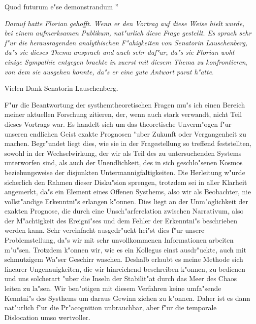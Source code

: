 \documentclass[a5paper,8pt]{book}
\begin{document}
Quod futurum e"se demonstrandum ''

\textit{Darauf hatte Florian gehofft. Wenn er den Vortrag auf diese Weise hielt wurde, bei einem aufmerksamen Publikum, nat"urlich diese Frage gestellt. Es sprach sehr f"ur die herausragenden analythischen F"ahigkeiten von Senatorin Lauschenberg, da"s sie dieses Thema ansprach und auch sehr daf"ur, da"s sie Florian wohl einige Sympathie entgegen brachte in zuerst mit diesem Thema zu konfrontieren, von dem sie ausgehen konnte, da"s er eine gute Antwort parat h"atte.}

\grqq Vielen Dank Senatorin Lauschenberg.

F"ur die Beantwortung der systhemtheoretischen Fragen mu"s ich einen Bereich meiner aktuellen Forschung zitieren, der, wenn auch stark verwandt, nicht Teil dieses Vortrags war. Es handelt sich um das theoretische Unverm"ogen f"ur unseren endlichen Geist exakte Prognosen "uber Zukunft oder Vergangenheit zu machen. Begr"undet liegt dies, wie sie in der Fragestellung so treffend feststellten, sowohl in der Wechselwirkung, der wir als Teil des zu untersuchenden Systems unterworfen sind, als auch der Unendlichkeit, des in sich geschlo"senen Kosmos beziehungsweise der disjunkten Untermannigfaltigkeiten.
Die Herleitung w"urde sicherlich den Rahmen dieser Disku"sion sprengen, trotzdem sei in aller Klarheit angemerkt, da"s ein Element eines Offenen Systhems, also wir als Beobachter, nie vollst"andige Erkenntni"s erlangen k"onnen. Dies liegt an der Unm"oglichkeit der exakten Prognose, die durch eine Unsch"arferelation zwischen Narrativum, also der \grqq M"achtigkeit \grqq des Ereigni"ses und dem Fehler der Erkenntni"s beschrieben werden kann.
Sehr vereinfacht ausgedr"uckt hei"st dies f"ur unsere Problemstellung, da"s wir mit sehr unvollkommenen Informationen arbeiten m"u"sen. Trotzdem k"onnen wir, wie es ein Kollegus einst ausdr"uckte, auch mit schmutzigem Wa"ser Geschirr waschen. Deshalb erlaubt es meine Methode sich linearer Ungenauigkeiten, die wir hinreichend beschreiben k"onnen, zu bedienen und uns solcherart "uber die Inseln der Stabilit"at durch das Meer des Chaos leiten zu la"sen. Wir ben"otigen mit diesem Verfahren keine umfa"sende Kenntni"s des Systhems um daraus Gewinn ziehen zu k"onnen. Daher ist es dann nat"urlich f"ur die Pr"acognition unbrauchbar, aber f"ur die temporale Dislocation umso wertvoller.
\end{document}

